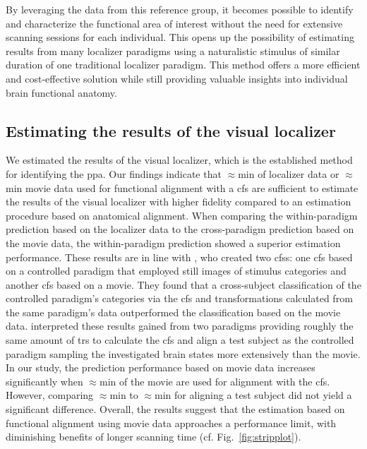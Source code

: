 

\footnotesize

%
By leveraging the data from this reference group, it becomes possible to
identify and characterize the functional area of interest without the need for
extensive scanning sessions for each individual.
%
This opens up the possibility of estimating results from many localizer
paradigms using a naturalistic stimulus of similar duration of one traditional
localizer paradigm.
%
This method offers a more efficient and cost-effective solution while still
providing valuable insights into individual brain functional anatomy.

\normalsize


\subsection{Estimating the results of the visual localizer}

We estimated the results of the visual localizer, which is the established
method for identifying the \ac{ppa}.
%
Our findings indicate that $\approx$\unit[15]{min} of localizer data or
$\approx$\unit[15]{min} movie data used for functional alignment with a \ac{cfs}
are sufficient to estimate the results of the visual localizer with higher
fidelity compared to an estimation procedure based on anatomical alignment.
%
When comparing the within-paradigm prediction based on the localizer data to the
cross-paradigm prediction based on the movie data, the within-paradigm
prediction showed a superior estimation performance.
%
These results are in line with \citep{haxby2011common}, who created two
\acp{cfs}:
%
one \ac{cfs} based on a controlled paradigm that employed still images of
stimulus categories and another \ac{cfs} based on a movie.
%
They found that a cross-subject classification of the controlled paradigm's
categories via the \ac{cfs} and transformations calculated from the same
paradigm's data outperformed the classification based on the movie data.
%
\citet{haxby2011common} interpreted these results gained from two paradigms
providing roughly the same amount of \acp{tr} to calculate the \ac{cfs} and
align a test subject as the controlled paradigm sampling the investigated brain
states more extensively than the movie.
%
In our study, the prediction performance based on movie data increases
significantly when $\approx$\unit[30]{min} of the movie are used for alignment
with the \ac{cfs}.
%
However, comparing $\approx$\unit[30]{min} to $\approx$\unit[45]{min} for
aligning a test subject did not yield a significant difference.
%
Overall, the results suggest that the estimation based on functional alignment
using movie data approaches a performance limit, with diminishing benefits of
longer scanning time (cf. Fig.~\ref{fig:stripplot}).

